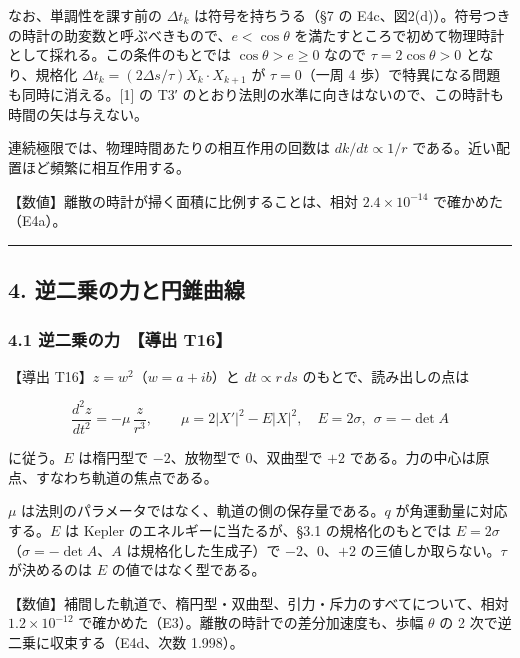 \documentclass[
  a4paper,
]{ltjsarticle}
\begin{document}
なお、単調性を課す前の \(\Delta t_k\) は符号を持ちうる（§7 の
E4c、図2(d)）。符号つきの時計の助変数と呼ぶべきもので、\(e<\cos\theta\)
を満たすところで初めて物理時計として採れる。この条件のもとでは
\(\cos\theta>e\ge0\) なので \(\tau=2\cos\theta>0\) となり、規格化
\(\Delta t_k=(2\Delta s/\tau)X_k\cdot X_{k+1}\) が \(\tau=0\)（一周 4
歩）で特異になる問題も同時に消える。{[}1{]} の T3′
のとおり法則の水準に向きはないので、この時計も時間の矢は与えない。

連続極限では、物理時間あたりの相互作用の回数は \(dk/dt\propto1/r\)
である。近い配置ほど頻繁に相互作用する。

【数値】離散の時計が掃く面積に比例することは、相対 \(2.4\times10^{-14}\)
で確かめた（E4a）。

\begin{center}\rule{0.5\linewidth}{0.5pt}\end{center}

\subsection{4.
逆二乗の力と円錐曲線}\label{ux9006ux4e8cux4e57ux306eux529bux3068ux5186ux9310ux66f2ux7dda}

\subsubsection{4.1 逆二乗の力　【導出
T16】}\label{ux9006ux4e8cux4e57ux306eux529b-ux5c0eux51fa-t16}

【導出 T16】\(z=w^2\)（\(w=a+ib\)）と \(dt\propto r\,ds\)
のもとで、読み出しの点は

\[
\boxed{\;\frac{d^2z}{dt^2}=-\mu\,\frac{z}{r^3},\qquad \mu=2\lvert X'\rvert^2-E\lvert X\rvert^2,\quad E=2\sigma,\ \ \sigma=-\det A\;}
\]

に従う。\(E\) は楕円型で \(-2\)、放物型で \(0\)、双曲型で \(+2\)
である。力の中心は原点、すなわち軌道の焦点である。

\(\mu\) は法則のパラメータではなく、軌道の側の保存量である。\(q\)
が角運動量に対応する。\(E\) は Kepler のエネルギーに当たるが、§3.1
の規格化のもとでは \(E=2\sigma\)（\(\sigma=-\det A\)、\(A\)
は規格化した生成子）で \(-2\)、\(0\)、\(+2\)
の三値しか取らない。\(\tau\) が決めるのは \(E\) の値ではなく型である。

【数値】補間した軌道で、楕円型・双曲型、引力・斥力のすべてについて、相対
\(1.2\times10^{-12}\) で確かめた（E3）。離散の時計での差分加速度も、歩幅
\(\theta\) の 2 次で逆二乗に収束する（E4d、次数 1.998）。
\end{document}
